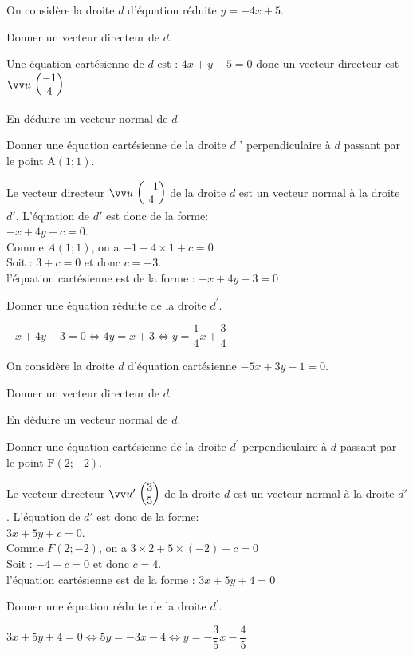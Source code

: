 \documentclass[11pt,a4paper]{article}  %
\begin{document}
\exerciceDS{}
On considère la droite $d$ d'équation réduite $y=-4 x+5$.
\begin{enumMet}
	\item Donner un vecteur directeur de $d$.
	\begin{corrBox}
		Une équation cartésienne de $d$ est : $4x+y-5=0$ donc un vecteur directeur est $\Coord{u}{-1}{4}$
	\end{corrBox}
	\item En déduire un vecteur normal de $d$. 
	\item Donner une équation cartésienne de la droite $d$ ' perpendiculaire à $d$ passant par le point $\mathrm{A}(1 ; 1)$.
	\begin{corrBox}
		Le vecteur directeur $\Coord{u}{-1}{4}$ de la droite $d$ est un vecteur normal à la droite $d'$. L'équation de $d'$ est donc de la forme:\\
		$-x+4y+c=0$.\\
		Comme $A(1 ; 1)$, on a $-1+4\times1+c=0$\\
		Soit : $3+c=0$ et donc $c=-3$.\\
		l'équation cartésienne est de la forme : $-x+4y-3=0$
	\end{corrBox}
	\item Donner une équation réduite de la droite $d^{\prime}$.
	\begin{corrBox}
		$-x+4y-3=0 \iff 4y=x+3 \iff y=\dfrac{1}{4}x+\dfrac{3}{4}$
	\end{corrBox}
\end{enumMet}

\exerciceDS{}
On considère la droite $d$ d'équation cartésienne $-5 x+3 y-1=0$.
\begin{enumMet}
	\item Donner un vecteur directeur de $d$. 
	\item En déduire un vecteur normal de $d$. 
	\item Donner une équation cartésienne de la droite $d^{\prime}$ perpendiculaire à $d$ passant par le point $\mathrm{F}(2 ;-2)$.
	\begin{corrBox}
		Le vecteur directeur $\Coord{u'}{3}{5}$ de la droite $d$ est un vecteur normal à la droite $d'$. L'équation de $d'$ est donc de la forme:\\
		$3x+5y+c=0$.\\
		Comme $F(2 ; -2)$, on a $3\times2+5\times(-2)+c=0$\\
		Soit : $-4+c=0$ et donc $c=4$.\\
		l'équation cartésienne est de la forme : $3x+5y+4=0$
	\end{corrBox}
	\item Donner une équation réduite de la droite $d^{\prime}$.
	\begin{corrBox}
		$3x+5y+4=0 \iff 5y=-3x-4 \iff y=-\dfrac{3}{5}x-\dfrac{4}{5}$
	\end{corrBox}
\end{enumMet}
\end{document}
